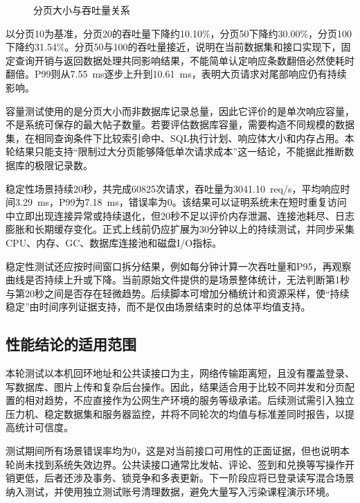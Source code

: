 \documentclass[bwprint]{report}
\begin{document}
\begin{figure}[H]
\centering
{}
\caption{分页大小与吞吐量关系}
\label{fig:capacity-chart}
\end{figure}

以分页10为基准，分页20的吞吐量下降约10.10\%，分页50下降约30.00\%，分页100下降约31.54\%。分页50与100的吞吐量接近，说明在当前数据集和接口实现下，固定查询开销与返回数据处理共同影响结果，不能简单认定响应条数翻倍必然使耗时翻倍。P99则从7.55~ms逐步上升到10.61~ms，表明大页请求对尾部响应仍有持续影响。

容量测试使用的是分页大小而非数据库记录总量，因此它评价的是单次响应容量，不是系统可保存的最大帖子数量。若要评估数据库容量，需要构造不同规模的数据集，在相同查询条件下比较索引命中、SQL执行计划、响应体大小和内存占用。本轮结果只能支持“限制过大分页能够降低单次请求成本”这一结论，不能据此推断数据库的极限记录数。

稳定性场景持续20秒，共完成60825次请求，吞吐量为3041.10~req/s，平均响应时间3.29~ms，P99为7.18~ms，错误率为0。该结果可以证明系统未在短时重复访问中立即出现连接异常或持续退化，但20秒不足以评价内存泄漏、连接池耗尽、日志膨胀和长期缓存变化。正式上线前仍应扩展为30分钟以上的持续测试，并同步采集CPU、内存、GC、数据库连接池和磁盘I/O指标。

稳定性测试还应按时间窗口拆分结果，例如每分钟计算一次吞吐量和P95，再观察曲线是否持续上升或下降。当前原始文件提供的是场景整体统计，无法判断第1秒与第20秒之间是否存在轻微趋势。后续脚本可增加分桶统计和资源采样，使“持续稳定”由时间序列证据支持，而不是仅由场景结束时的总体平均值支持。

\subsection{性能结论的适用范围}
本轮测试以本机回环地址和公共读接口为主，网络传输距离短，且没有覆盖登录、写数据库、图片上传和复杂后台操作。因此，结果适合用于比较不同并发和分页配置的相对趋势，不应直接作为公网生产环境的服务等级承诺。后续测试需引入独立压力机、稳定数据集和服务器监控，并将不同轮次的均值与标准差同时报告，以提高统计可信度。

测试期间所有场景错误率均为0，这是对当前接口可用性的正面证据，但也说明本轮尚未找到系统失效边界。公共读接口通常比发帖、评论、签到和兑换等写操作开销更低，后者还涉及事务、锁竞争和多表更新。下一阶段应将已登录读写混合场景纳入测试，并使用独立测试账号清理数据，避免大量写入污染课程演示环境。
\end{document}
